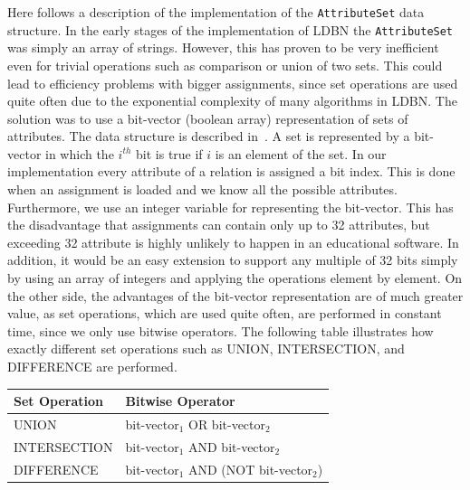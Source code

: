 Here follows a description of the implementation of the \verb=AttributeSet= data structure. 
In the early stages of the implementation of LDBN the \verb=AttributeSet=
was simply an array of strings. However, this has proven to be very
inefficient even for trivial operations such as comparison or union of two sets. This could 
lead to efficiency problems with
bigger assignments, since set operations are used quite often due to the exponential
complexity of many algorithms in LDBN. 
The solution was to use a bit-vector (boolean array) representation of sets of attributes. 
The data structure is described 
in~\cite[Section 4.3]{AhoHU83dsabook}. 
A set is represented by a bit-vector in which the $i^{th}$ bit is true if $i$ is an element of the set. In our
implementation every attribute of a relation is assigned a bit index. This is
done when an assignment is loaded and
we know all the possible attributes. Furthermore, we use an integer variable for representing
the bit-vector. This has the disadvantage that
assignments can contain only up to 32 attributes, but exceeding 32 attribute 
is highly unlikely to happen in an educational software. In addition, 
it would be an easy extension to support any multiple
of 32 bits simply by using an array of integers and applying the
operations element by element. On the other side, the 
advantages of the bit-vector representation are of much greater value, 
as set operations, which are used quite 
often, are performed in constant time, since we only use bitwise operators. The following 
table illustrates how exactly different set operations such as 
UNION, INTERSECTION, and DIFFERENCE are performed.
 
\begin{center}
\begin{tabular}[h]{|l|l|}
\hline
Set Operation & Bitwise Operator \\
\hline
\hline
UNION        & bit-vector$_1$  OR  bit-vector$_2$ \\
INTERSECTION & bit-vector$_1$ AND  bit-vector$_2$ \\
DIFFERENCE   & bit-vector$_1$ AND (NOT bit-vector$_2$) \\
\hline
\end{tabular}
\end{center}

